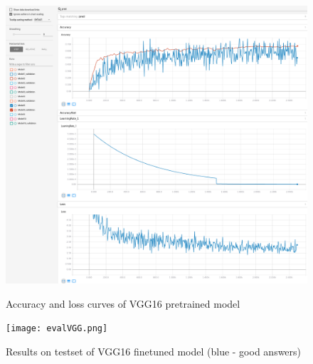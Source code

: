 \documentclass[a4paper]{article}
\begin{document}
\begin{figure}[h]
    \caption[]{Accuracy and loss curves of VGG16 pretrained model}
    \centering
    \includegraphics[page=2,width=1.0\textwidth]{vggTraining.png}
    \label{fig:trainingVGG}
\end{figure}

\begin{figure}[h]
    \caption[]{Results on testset of VGG16 finetuned model (blue - good answers)}
    \centering
    \texttt{[image: evalVGG.png]}
    \label{fig:evalVGG}
\end{figure}


\end{document}
